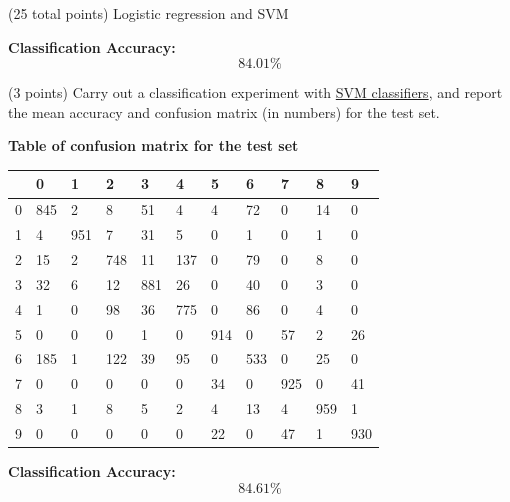 \documentclass[12pt]{article}
\begin{document}
\begin{question}{(25 total points) Logistic regression and SVM}
\begin{subquestion}
\begin{answerbox}{30em}
        \medskip
        \noindent
        \textbf{Classification Accuracy:}
        $$84.01\%$$
      \end{answerbox}
  


   \end{subquestion}
   \begin{subquestion}{(3 points)
       Carry out a classification experiment with
       \href{https://scikit-learn.org/0.19/modules/generated/sklearn.svm.SVC.html}{SVM classifiers}, and report the
       mean accuracy and confusion matrix (in numbers) for the test
       set.
     } \label{Q2.2}


   

      \begin{answerbox}{30em}
        \textbf{Table of confusion matrix for the test set}
        \bigskip
        \small
        \centering
        \begin{tabular}{@{}lllllllllll@{}}
        \toprule
             & 0 & 1 & 2 & 3 & 4 & 5 & 6 & 7 & 8 & 9 \\ \midrule
            0 & 845 & 2 & 8 & 51 & 4 & 4 & 72 & 0 & 14 & 0 \\ 
            1 & 4 & 951 & 7 & 31 & 5 & 0 & 1 & 0 & 1 & 0 \\ 
            2 & 15 & 2 & 748 & 11 & 137 & 0 & 79 & 0 & 8 & 0 \\ 
            3 & 32 & 6 & 12 & 881 & 26 & 0 & 40 & 0 & 3 & 0 \\ 
            4 & 1 & 0 & 98 & 36 & 775 & 0 & 86 & 0 & 4 & 0 \\ 
            5 & 0 & 0 & 0 & 1 & 0 & 914 & 0 & 57 & 2 & 26 \\ 
            6 & 185 & 1 & 122 & 39 & 95 & 0 & 533 & 0 & 25 & 0 \\ 
            7 & 0 & 0 & 0 & 0 & 0 & 34 & 0 & 925 & 0 & 41 \\ 
            8 & 3 & 1 & 8 & 5 & 2 & 4 & 13 & 4 & 959 & 1 \\ 
            9 & 0 & 0 & 0 & 0 & 0 & 22 & 0 & 47 & 1 & 930 \\ \bottomrule 
        \end{tabular}
        
        \medskip
        \noindent
        \textbf{Classification Accuracy:}
        $$84.61\%$$

      \end{answerbox}
  



\end{subquestion}
\end{question}
\end{document}
